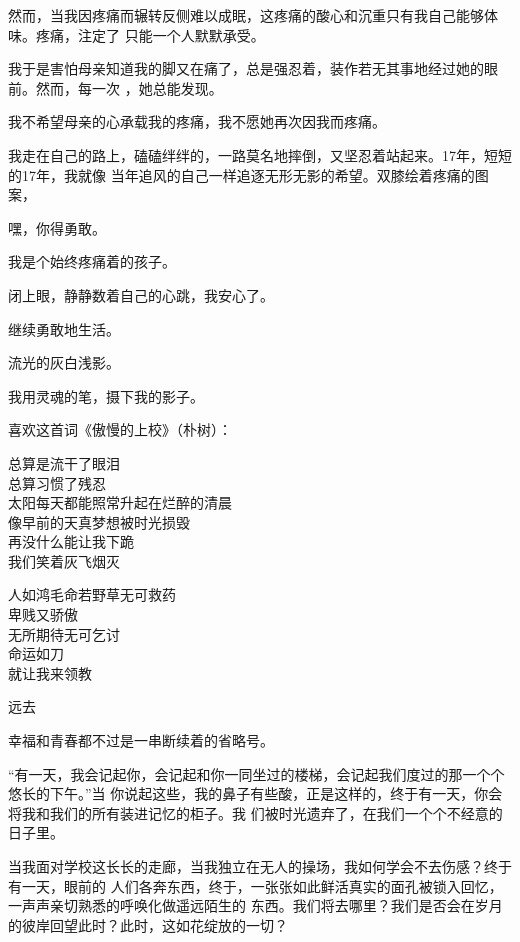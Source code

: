 \documentclass[12pt,a4paper]{article}
\def\blankrev{\vspace{1ex}}									%
\newcommand{\subpart}[1]{
	\begingroup \par
	\vspace{1ex} \centering #1
	\par \endgroup \nopagebreak[4]
}
\begin{document}
		然而，当我因疼痛而辗转反侧难以成眠，这疼痛的酸心和沉重只有我自己能够体味。疼痛，注定了
	只能一个人默默承受。

		我于是害怕母亲知道我的脚又在痛了，总是强忍着，装作若无其事地经过她的眼前。然而，每一次
	，她总能发现。

		我不希望母亲的心承载我的疼痛，我不愿她再次因我而疼痛。

		我走在自己的路上，磕磕绊绊的，一路莫名地摔倒，又坚忍着站起来。17年，短短的17年，我就像
	当年追风的自己一样追逐无形无影的希望。双膝绘着疼痛的图案，

		嘿，你得勇敢。

		我是个始终疼痛着的孩子。


		\blankrev
		闭上眼，静静数着自己的心跳，我安心了。\par
		继续勇敢地生活。


		\blankrev
		流光的灰白浅影。\par
		我用灵魂的笔，摄下我的影子。

		\blankrev
		喜欢这首词《傲慢的上校》（朴树）：

		\longpoem{}{}{}
		总算是流干了眼泪 \\
		总算习惯了残忍 \\
		太阳每天都能照常升起在烂醉的清晨 \\
		像早前的天真梦想被时光损毁 \\
		再没什么能让我下跪 \\
		我们笑着灰飞烟灭

		人如鸿毛命若野草无可救药 \\
		卑贱又骄傲 \\
		无所期待无可乞讨 \\
		命运如刀 \\
		就让我来领教
		\endlongpoem

	\endwriting



		\subpart{远去}
		幸福和青春都不过是一串断续着的省略号。

		\blankrev
		“有一天，我会记起你，会记起和你一同坐过的楼梯，会记起我们度过的那一个个悠长的下午。”当
	你说起这些，我的鼻子有些酸，正是这样的，终于有一天，你会将我和我们的所有装进记忆的柜子。我
	们被时光遗弃了，在我们一个个不经意的日子里。

		当我面对学校这长长的走廊，当我独立在无人的操场，我如何学会不去伤感？终于有一天，眼前的
	人们各奔东西，终于，一张张如此鲜活真实的面孔被锁入回忆，一声声亲切熟悉的呼唤化做遥远陌生的
	东西。我们将去哪里？我们是否会在岁月的彼岸回望此时？此时，这如花绽放的一切？
\end{document}
